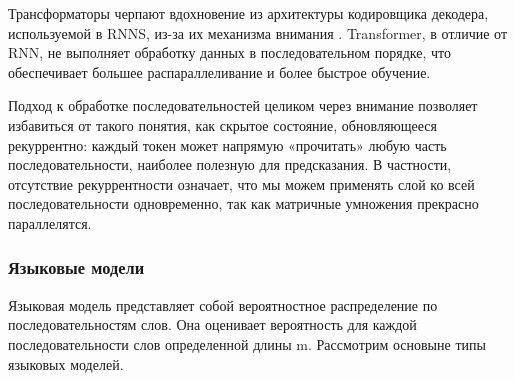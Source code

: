Трансформаторы черпают вдохновение из архитектуры кодировщика декодера, используемой в RNNS, из-за их механизма внимания \cite{bib:atten:1}. Transformer, в отличие от RNN, не выполняет обработку данных в последовательном порядке, что обеспечивает большее распараллеливание и более быстрое обучение.

Подход к обработке последовательностей целиком через внимание позволяет избавиться от такого понятия, как скрытое состояние, обновляющееся рекуррентно: каждый токен может напрямую «прочитать» любую часть последовательности, наиболее полезную для предсказания. В частности, отсутствие рекуррентности означает, что мы можем применять слой ко всей последовательности одновременно, так как матричные умножения прекрасно параллелятся.

\subsubsection{Языковые модели}

Языковая модель представляет собой вероятностное распределение по последовательностям слов. Она оценивает вероятность для каждой последовательности слов определенной длины m. Рассмотрим основыне типы языковых моделей.

